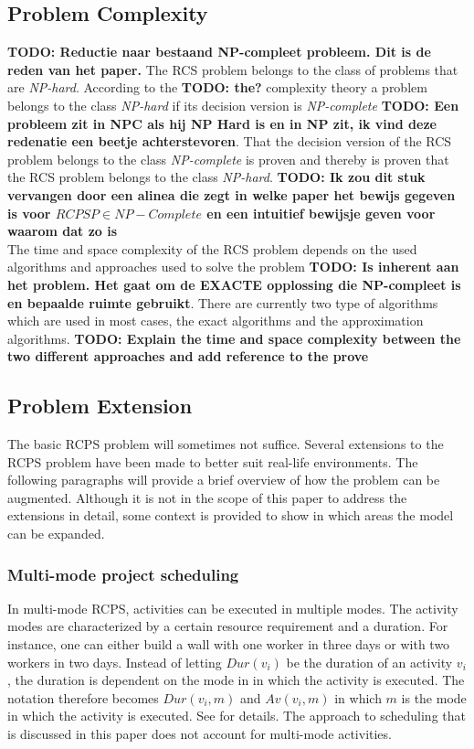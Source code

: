 \documentclass{article}
\newcommand{\TODO}[1]{{\color{red}\textbf{TODO: #1}}}
\newcommand{\dur}[1]{\textit{Dur}(#1)} %
\begin{document}
\subsection{Problem Complexity}
\TODO{Reductie naar bestaand NP-compleet probleem. Dit is de reden van het paper.}
The RCS problem belongs to the class of problems that are \emph{NP-hard}. According to the \TODO{the?} complexity theory a problem belongs to the class \emph{NP-hard} if its decision version is \emph{NP-complete} \TODO{Een probleem zit in NPC als hij NP Hard is en in NP zit, ik vind deze redenatie een beetje achterstevoren}. 
That the decision version of the RCS problem belongs to the class \emph{NP-complete} is proven and thereby is proven that the RCS problem belongs to the class \emph{NP-hard}. 
\TODO{Ik zou dit stuk vervangen door een alinea die zegt in welke paper het bewijs gegeven is voor $RCPSP \in NP-Complete$ en een intuitief bewijsje geven voor waarom dat zo is}\\
The time and space complexity of the RCS problem depends on the used algorithms and approaches used to solve the problem \TODO{Is inherent aan het problem. Het gaat om de EXACTE opplossing die NP-compleet is en bepaalde ruimte gebruikt}. 
There are currently two type of algorithms which are used in most cases, the exact algorithms and the approximation algorithms.
\TODO{Explain the time and space complexity between the two different approaches and add reference to the prove}

\subsection{Problem Extension}
The basic RCPS problem will sometimes not suffice. Several extensions to the RCPS problem have been made to better suit real-life environments. The following paragraphs will provide a brief overview of how the problem can be augmented. Although it is not in the scope of this paper to address the extensions in detail, some context is provided to show in which areas the model can be expanded.

\subsubsection{Multi-mode project scheduling}
In multi-mode RCPS, activities can be executed in multiple modes. The activity modes are characterized by a certain resource requirement and a duration. For instance, one can either build a wall with one worker in three days or with two workers in two days. Instead of letting $\dur{v_i}$ be the duration of an activity $v_i$, the duration is dependent on the mode in in which the activity is executed. The notation therefore becomes $\textit{Dur}(v_i, m)$ and $\textit{Av}(v_i, m)$ in which $m$ is the mode in which the activity is executed. See \citet{herroelen05} for details. The approach to scheduling that is discussed in this paper does not account for multi-mode activities.
\end{document}
